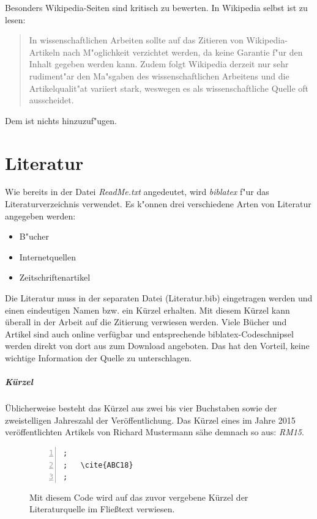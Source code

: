 Besonders Wikipedia-Seiten sind kritisch zu bewerten. In Wikipedia selbst ist zu lesen:
\begin{quote}
\glqq In wissenschaftlichen Arbeiten sollte auf das Zitieren von Wikipedia-Artikeln nach M"oglichkeit verzichtet werden, da keine Garantie f"ur den Inhalt gegeben werden kann.
Zudem folgt Wikipedia derzeit nur sehr rudiment"ar den Ma"sgaben des wissenschaftlichen Arbeitens und die Artikelqualit"at variiert stark, weswegen es als wissenschaftliche Quelle oft ausscheidet.\grqq \cite{zitieren13a}
\end{quote}
Dem ist nichts hinzuzuf"ugen.

\section{Literatur}
\label{sec:Literatur}

Wie bereits in der Datei \textit{ReadMe.txt} angedeutet, wird \textit{biblatex} f"ur das Literaturverzeichnis verwendet. Es k"onnen drei verschiedene Arten von Literatur angegeben werden:

\begin{itemize}
\item B"ucher\cite{wissentschaftlichesArbeitMitLatex}
\item Internetquellen\cite{zitieren13a}
\item Zeitschriftenartikel
\end{itemize}

Die Literatur muss in der separaten Datei (Literatur.bib) eingetragen werden und einen eindeutigen Namen bzw. ein Kürzel erhalten. Mit diesem Kürzel kann überall in der Arbeit auf die Zitierung verwiesen werden. Viele Bücher und Artikel sind auch online verfügbar und entsprechende biblatex-Codeschnipsel werden direkt von dort aus zum Download angeboten. Das hat den Vorteil, keine wichtige Information der Quelle zu unterschlagen.

\subparagraph{Kürzel}
Üblicherweise besteht das Kürzel aus zwei bis vier Buchstaben sowie der zweistelligen Jahreszahl der Veröffentlichung. Das Kürzel eines im Jahre 2015 veröffentlichten Artikels von Richard Mustermann sähe demnach so aus: \textit{RM15}.

\FloatBarrier
\begin{figure}[htb]
\begin{lstlisting}[backgroundcolor={\color{white}},
basicstyle={\normalsize\sffamily},
breaklines=true,
frame={bottomline,topline, rightline},
language=HTML,
numbers=left,
showstringspaces=false,
xleftmargin=22pt]	
;
;	\cite{ABC18}
;           
\end{lstlisting}
  \caption[Einbinden einer Literaturquelle]{Mit diesem Code wird auf das zuvor vergebene Kürzel der Literaturquelle im Fließtext verwiesen.}
\label{lst:literaturenquelle}
\end{figure}


